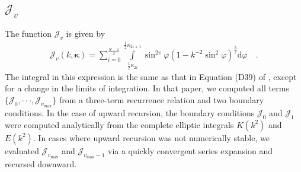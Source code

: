 \documentclass[modern]{aastex62}
\newcommand{\kap}{\boldsymbol{\kappa}}
\newcommand{\kmt}{k^{-2}}
\newcommand{\vmax}{{v_\mathrm{max}}}
\begin{document}
\subsection{$\mathcal{J}_v$}
%
The function $\mathcal{J}_v$ is given by
%
\begin{align}
    \label{eq:J}
    \mathcal{J}_v(k, \kap) =
    \sum_{i = 0}^{\frac{N - 1}{2}}
    \int\limits_{\frac{1}{2}\kappa_{2i}}^{\frac{1}{2}\kappa_{2i+1}}
    \sin^{2v}\varphi
    \left(1 - \kmt\sin^2\varphi\right)^\frac{3}{2}
    \mathrm{d}\varphi
    \quad.
\end{align}
%
The integral in this expression is the same as that in Equation (D39)
of \citet{Luger2019}, except for a change in the limits of integration.
In that paper, we computed all terms
$\{ \mathcal{J}_0, {\cdot\cdot\cdot}, \mathcal{J}_\vmax \}$ from a three-term
recurrence relation and two boundary conditions. In the case of upward recursion,
the boundary conditions $\mathcal{J}_0$ and $\mathcal{J}_1$ were computed
analytically from the complete elliptic
integrals $K(k^2)$ and $E(k^2)$. In cases where upward recursion was not
numerically stable, we evaluated $\mathcal{J}_\vmax$ and $\mathcal{J}_{\vmax-1}$
via a quickly convergent series expansion and recursed downward.
\end{document}
